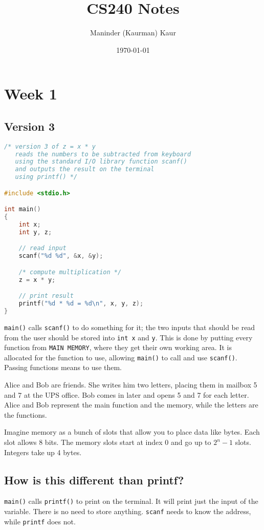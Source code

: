 \documentclass{article}
\title{CS240 Notes}
\author{Maninder (Kaurman) Kaur}
\date{\today}
\begin{document}
\maketitle

\section*{Week 1}
\subsection*{Version 3}
\begin{lstlisting}[language=C]
/* version 3 of z = x * y
   reads the numbers to be subtracted from keyboard
   using the standard I/O library function scanf()
   and outputs the result on the terminal
   using printf() */

#include <stdio.h>

int main()
{
    int x;
    int y, z;

    // read input
    scanf("%d %d", &x, &y);

    /* compute multiplication */
    z = x * y;

    // print result
    printf("%d * %d = %d\n", x, y, z);
}
\end{lstlisting}

\texttt{main()} calls \texttt{scanf()} to do something for it; the two inputs that should be read from the user should be stored into \texttt{int x} and \texttt{y}. This is done by putting every function from \texttt{MAIN MEMORY}, where they get their own working area. It is allocated for the function to use, allowing \texttt{main()} to call and use \texttt{scanf()}. Passing functions means to use them.

Alice and Bob are friends. She writes him two letters, placing them in mailbox 5 and 7 at the UPS office. Bob comes in later and opens 5 and 7 for each letter. Alice and Bob represent the main function and the memory, while the letters are the functions.

Imagine memory as a bunch of slots that allow you to place data like bytes. Each slot allows 8 bits. The memory slots start at index 0 and go up to \( 2^{n}-1\) slots. Integers take up 4 bytes.

\subsection*{How is this different than printf?}
\texttt{main()} calls \texttt{printf()} to print on the terminal. It will print just the input of the variable. There is no need to store anything. \texttt{scanf} needs to know the address, while \texttt{printf} does not.
\end{document}
